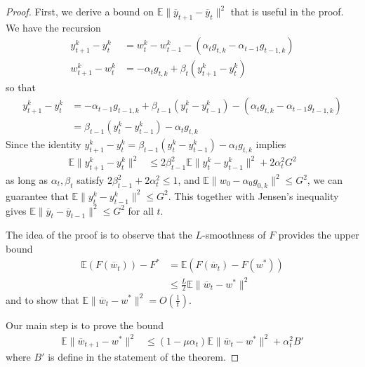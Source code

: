 \begin{proof}
	First, we derive a bound on $\mathbb{E}\|\overline{y}_{t+1}-\overline{y}_{t}\|^{2}$
	that is useful in the proof. We have the recursion 
	\begin{align*}
	y_{t+1}^{k}-y_{t}^{k} & =w_{t}^{k}-w_{t-1}^{k}-(\alpha_{t}g_{t,k}-\alpha_{t-1}g_{t-1,k})\\
	w_{t+1}^{k}-w_{t}^{k} & =-\alpha_{t}g_{t,k}+\beta_{t}(y_{t+1}^{k}-y_{t}^{k})
	\end{align*}
	so that 
	\begin{align*}
	y_{t+1}^{k}-y_{t}^{k} & =-\alpha_{t-1}g_{t-1,k}+\beta_{t-1}(y_{t}^{k}-y_{t-1}^{k})-(\alpha_{t}g_{t,k}-\alpha_{t-1}g_{t-1,k})\\
	& =\beta_{t-1}(y_{t}^{k}-y_{t-1}^{k})-\alpha_{t}g_{t,k}
	\end{align*}
	Since the identity $y_{t+1}^{k}-y_{t}^{k}=\beta_{t-1}(y_{t}^{k}-y_{t-1}^{k})-\alpha_{t}g_{t,k}$
	implies 
	\begin{align*}
	\mathbb{E}\|y_{t+1}^{k}-y_{t}^{k}\|^{2} & \leq2\beta_{t-1}^{2}\mathbb{E}\|y_{t}^{k}-y_{t-1}^{k}\|^{2}+2\alpha_{t}^{2}G^{2}
	\end{align*}
	as long as $\alpha_{t},\beta_{t}$ satisfy $2\beta_{t-1}^{2}+2\alpha_{t}^{2}\leq1$,
	and\textbf{ $\mathbb{E}\|w_{0}-\alpha_{0}g_{0,k}\|^{2}\leq G^{2}$},
	we can guarantee that $\mathbb{E}\|y_{t}^{k}-y_{t-1}^{k}\|^{2}\leq G^{2}$.
	This together with Jensen's inequality gives $\mathbb{E}\|\overline{y}_{t}-\overline{y}_{t-1}\|^{2}\leq G^{2}$
	for all $t$. 
	
	The idea of the proof is to observe that the $L$-smoothness of $F$
	provides the upper bound
	\begin{align*}
	\mathbb{E}(F(\overline{w}_{t}))-F^{\ast} & =\mathbb{E}(F(\overline{w}_{t})-F(w^{\ast}))\\
	& \leq\frac{L}{2}\mathbb{E}\|\overline{w}_{t}-w^{\ast}\|^{2}
	\end{align*}
	and to show that $\mathbb{E}\|\overline{w}_{t}-w^{\ast}\|^{2}=O(\frac{1}{t})$. 
	
	Our main step is to prove the bound 
	\begin{align*}
	\mathbb{E}\|\overline{w}_{t+1}-w^{\ast}\|^{2} & \leq(1-\mu\alpha_{t})\mathbb{E}\|\overline{w}_{t}-w^{\ast}\|^{2}+\alpha_{t}^{2}B'
	\end{align*}
	where $B'$ is define in the statement of the theorem. 
	

\end{proof}
